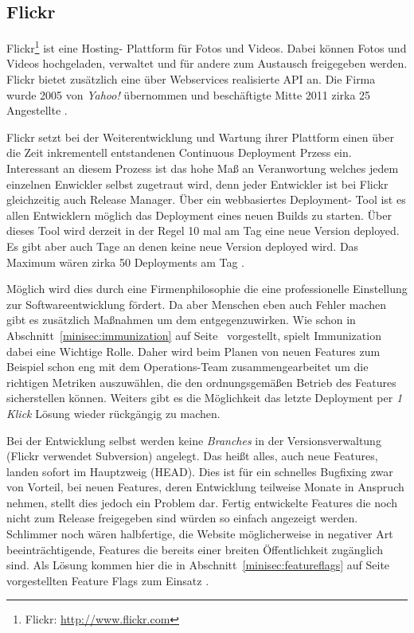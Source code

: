 \subsection{Flickr}

Flickr\footnote{Flickr: \url{http://www.flickr.com}} ist eine Hosting-
Plattform für Fotos und Videos. Dabei können Fotos und Videos hochgeladen,
verwaltet und für andere zum Austausch freigegeben werden. Flickr bietet
zusätzlich eine über Webservices realisierte API an. Die Firma wurde 2005 von
\emph{Yahoo!} übernommen und beschäftigte Mitte 2011 zirka 25 Angestellte
\cite{flickr11}.

Flickr setzt bei der Weiterentwicklung und Wartung ihrer Plattform einen über
die Zeit inkrementell entstandenen Continuous Deployment Przess ein.
Interessant an diesem Prozess ist das hohe Maß an Veranwortung welches jedem
einzelnen Enwickler selbst zugetraut wird, denn jeder Entwickler ist bei
Flickr gleichzeitig auch Release Manager. Über ein webbasiertes Deployment-
Tool ist es allen Entwicklern möglich das Deployment eines neuen Builds zu
starten. Über dieses Tool wird derzeit in der Regel 10 mal am Tag eine neue
Version deployed. Es gibt aber auch Tage an denen keine neue Version deployed
wird. Das Maximum wären zirka 50 Deployments am Tag \cite{flickr11}.

Möglich wird dies durch eine Firmenphilosophie die eine professionelle
Einstellung \cite{flickr11} zur Softwareentwicklung fördert. Da aber Menschen
eben auch Fehler machen gibt es zusätzlich Maßnahmen um dem entgegenzuwirken.
Wie schon in Abschnitt~\ref{minisec:immunization} auf
Seite~\pageref{minisec:immunization} vorgestellt, spielt Immunization dabei
eine Wichtige Rolle. Daher wird beim Planen von neuen Features zum Beispiel
schon eng mit dem Operations-Team zusammengearbeitet um die richtigen Metriken
auszuwählen, die den ordnungsgemäßen Betrieb des Features sicherstellen
können. Weiters gibt es die Möglichkeit das letzte Deployment per \emph{1
Klick} Lösung wieder rückgängig zu machen. 

 Bei der Entwicklung selbst werden keine \emph{Branches} in
der Versionsverwaltung (Flickr verwendet Subversion) angelegt. Das heißt
alles, auch neue Features, landen sofort im Hauptzweig (HEAD). Dies ist für
ein schnelles Bugfixing zwar von Vorteil, bei neuen Features, deren
Entwicklung teilweise Monate in Anspruch nehmen, stellt dies jedoch ein
Problem dar. Fertig entwickelte Features die noch nicht zum Release
freigegeben sind würden so einfach angezeigt werden. Schlimmer noch wären
halbfertige, die Website möglicherweise in negativer Art beeinträchtigende,
Features die bereits einer breiten Öffentlichkeit zugänglich sind. Als Lösung
kommen hier die in Abschnitt~\ref{minisec:featureflags} auf
Seite~\pageref{minisec:featureflags} vorgestellten Feature Flags zum Einsatz
\cite{flickr09}.

